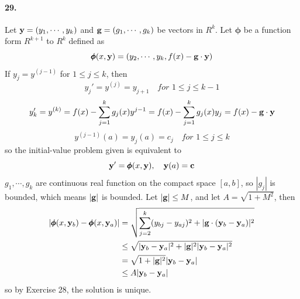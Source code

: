 \documentclass[a4paper]{article}
\begin{document}
\paragraph{29.}
Let $\mathbf{y}=(y_1,\cdots,y_k)$ and $\mathbf{g}=(g_1,\cdots,g_k)$ be vectors in $R^k$. Let $\pmb\phi$ be a function form $R^{k+1}$ to $R^k$ defined as 
\[
\pmb\phi(x,\mathbf{y})=(y_2,\cdots,y_k,f(x)-\mathbf{g}\cdot\mathbf{y})
\]
If $y_j=y^{(j-1)}$ for $1\leq j\leq k$, then
\[
y_j'=y^{(j)}=y_{j+1}\quad\textit{for $1\leq j\leq k-1$}\]
\[y_k'=y^{(k)}=f(x)-\sum_{j=1}^k g_j(x)y^{j-1}=f(x)-\sum_{j=1}^k g_j(x)y_j=f(x)-\mathbf{g}\cdot\mathbf{y} \]
\[
y^{(j-1)}(a)=y_j(a)=c_j\quad\textit{for $1\leq j\leq k$}
\]
so the initial-value problem given is equivalent to
\[
\mathbf{y}'=\pmb\phi(x,\mathbf{y}),\quad \mathbf{y}(a)=\mathbf{c}
\]
$g_1,\cdots,g_k$ are continuous real function on the compact space $[a,b]$, so $|g_j|$ is bounded, which means $|\mathbf{g}|$ is bounded. Let $|\mathbf{g}|\leq M$, and let $A=\sqrt{1+M^2}$, then
\begin{equation*}
    \begin{split}
        |\pmb\phi(x,\mathbf{y}_b)-\pmb\phi(x,\mathbf{y}_a)| & =\sqrt{\sum_{j=2}^k(y_{bj}-y_{aj})^2+|\mathbf{g}\cdot(\mathbf{y}_b-\mathbf{y}_a)|^2}\\
        & \leq \sqrt{|\mathbf{y}_b-\mathbf{y}_a|^2+|\mathbf{g}|^2|\mathbf{y}_b-\mathbf{y}_a|^2 }\\
        & =\sqrt{1+|\mathbf{g}|^2}|\mathbf{y}_b-\mathbf{y}_a|\\
        & \leq A|\mathbf{y}_b-\mathbf{y}_a|
    \end{split}
\end{equation*}
so by Exercise 28, the solution is unique.
\end{document}
